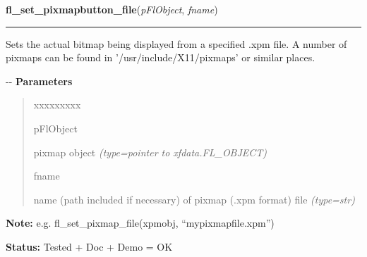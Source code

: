 \hspace{.8\funcindent}\begin{boxedminipage}{\funcwidth}

    \raggedright \textbf{fl\_set\_pixmapbutton\_file}(\textit{pFlObject}, \textit{fname})

    \vspace{-1.5ex}

    \rule{\textwidth}{0.5\fboxrule}
\setlength{\parskip}{2ex}

Sets the actual bitmap being displayed from a specified .xpm file. A
number of pixmaps can be found in '/usr/include/X11/pixmaps' or similar
places.

-{}-
\setlength{\parskip}{1ex}
      \textbf{Parameters}
      \vspace{-1ex}

      \begin{quote}
        \begin{Ventry}{xxxxxxxxx}

          \item[pFlObject]


pixmap object
            {\it (type=pointer to xfdata.FL\_OBJECT)}

          \item[fname]


name (path included if necessary) of pixmap (.xpm format) file
            {\it (type=str)}

        \end{Ventry}

      \end{quote}

\textbf{Note:} 
e.g. fl\_set\_pixmap\_file(xpmobj, ``mypixmapfile.xpm'')


\textbf{Status:} 
Tested + Doc + Demo = OK


    \end{boxedminipage}

    \label{xformslib:flbitmap:fl_set_pixmap_file}

    \vspace{0.5ex}

